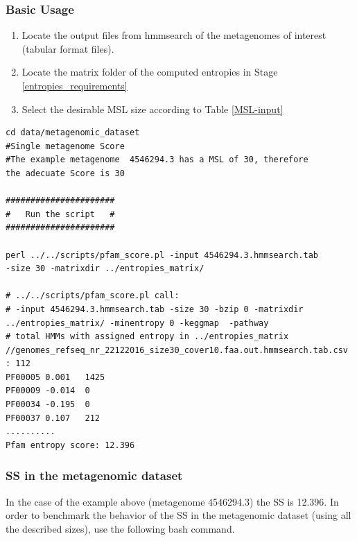 \documentclass[12pt]{report}
\begin{document}
\subsubsection{Basic Usage }

\begin{enumerate}
\item Locate the output files from hmmsearch of the metagenomes of interest (tabular format files). 
\item Locate the matrix folder of the computed entropies in Stage \ref{entropies_requirements} 
\item Select the desirable MSL size according to Table \ref{MSL-input}
\end{enumerate}
\begin{verbatim}
cd data/metagenomic_dataset
#Single metagenome Score 
#The example metagenome  4546294.3 has a MSL of 30, therefore 
the adecuate Score is 30

######################
#   Run the script   #
######################

perl ../../scripts/pfam_score.pl -input 4546294.3.hmmsearch.tab 
-size 30 -matrixdir ../entropies_matrix/  

# ../../scripts/pfam_score.pl call:
# -input 4546294.3.hmmsearch.tab -size 30 -bzip 0 -matrixdir 
../entropies_matrix/ -minentropy 0 -keggmap  -pathway 
# total HMMs with assigned entropy in ../entropies_matrix
//genomes_refseq_nr_22122016_size30_cover10.faa.out.hmmsearch.tab.csv : 112
PF00005 0.001   1425
PF00009 -0.014  0
PF00034 -0.195  0
PF00037 0.107   212
..........
Pfam entropy score: 12.396
\end{verbatim}
\subsubsection{SS in the metagenomic dataset}
In the case of the example above (metagenome 4546294.3) the SS is 12.396. In order to benchmark the behavior of the SS in the metagenomic dataset (using all the described sizes), use the following bash command. 
\end{document}
